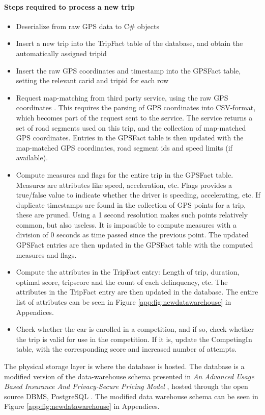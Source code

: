\paragraph{Steps required to process a new trip}
\begin{itemize}
\item Deserialize from raw GPS data to C\# objects
\item Insert a new trip into the TripFact table of the database, and obtain the automatically assigned tripid
\item Insert the raw GPS coordinates and timestamp into the GPSFact table, setting the relevant carid and tripid for each row
\item Request map-matching from third party service, using the raw GPS coordinates \cite{trackmatch}. This requires the parsing of GPS coordinates into CSV-format, which becomes part of the request sent to the service. The service returns a set of road segments used on this trip, and the collection of map-matched GPS coordinates. Entries in the GPSFact table is then updated with the map-matched GPS coordinates, road segment ids and speed limits (if available).
\item Compute measures and flags for the entire trip in the GPSFact table. Measures are attributes like speed, acceleration, etc. Flags provides a true/false value to indicate whether the driver is speeding,  accelerating, etc. If duplicate timestamps are found in the collection of GPS points for a trip, these are pruned. Using a 1 second resolution makes such points relatively common, but also useless. It is impossible to compute measures with a division of 0 seconds as time passed since the previous point. The updated GPSFact entries are then updated in the GPSFact table with the computed measures and flags.
\item Compute the attributes in the TripFact entry: Length of trip, duration, optimal score, tripscore and the count of each delinquency, etc. The attributes in the TripFact entry are then updated in the database. The entire list of attributes can be seen in Figure \ref{app:fig:newdatawarehouse} in Appendices.
\item Check whether the car is enrolled in a competition, and if so, check whether the trip is valid for use in the competition. If it is, update the CompetingIn table, with the corresponding score and increased number of attempts. 
\end{itemize}

The physical storage layer is where the database is hosted. The database is a modified version of the data-warehouse schema presented in \textit{An Advanced Usage Based Insurance And Privacy-Secure Pricing Model} \cite{sw9_report}, hosted through the open source DBMS, PostgreSQL \cite{postgresql}. The modified data warehouse schema can be seen in Figure \ref{app:fig:newdatawarehouse} in Appendices.